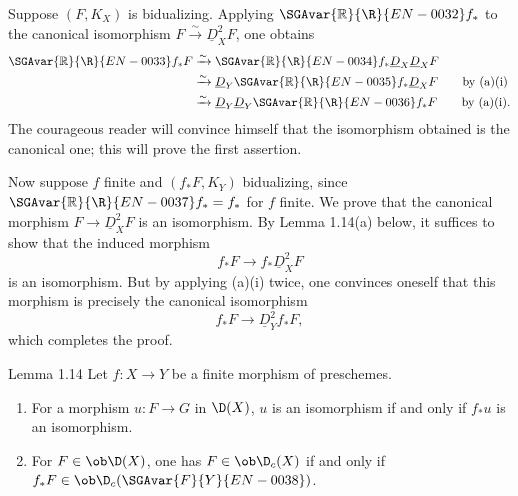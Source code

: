 \begin{prooftext}
Suppose $(F,K_X)$ is bidualizing. Applying $\SGAvar{\mathbb{R}}{\R}{EN-0032} f_*$ to the canonical isomorphism $F\xrightarrow{\sim}\underline D_X^2F$, one obtains
\begin{align*}
\SGAvar{\mathbb{R}}{\R}{EN-0033} f_*F &\xrightarrow{\sim}\SGAvar{\mathbb{R}}{\R}{EN-0034} f_*\underline D_X\underline D_XF \\
&\xrightarrow{\sim}\underline D_Y\SGAvar{\mathbb{R}}{\R}{EN-0035} f_*\underline D_XF \qquad \text{by (a)(i)}\\
&\xrightarrow{\sim}\underline D_Y\underline D_Y\SGAvar{\mathbb{R}}{\R}{EN-0036} f_*F \qquad \text{by (a)(i)}.
\end{align*}
The courageous reader will convince himself that the isomorphism obtained is the canonical one; this will prove the first assertion.

Now suppose $f$ finite and $(f_*F,K_Y)$ bidualizing, since $\SGAvar{\mathbb{R}}{\R}{EN-0037} f_*=f_*$ for $f$ finite. We prove that the canonical morphism $F\to\underline D_X^2F$ is an isomorphism. By Lemma 1.14(a) below, it suffices to show that the induced morphism
\[
   f_*F\longrightarrow f_*\underline D_X^2F
\]
is an isomorphism. But by applying (a)(i) twice, one convinces oneself that this morphism is precisely the canonical isomorphism
\[
   f_*F\longrightarrow \underline D_Y^2f_*F,
\]
which completes the proof. \qedtext
\end{prooftext}

\begin{statement}{Lemma 1.14}
Let $f:X\to Y$ be a finite morphism of preschemes.
\begin{enumerate}[label=\alph*)]
\item For a morphism $u:F\to G$ in $\D(X)$, $u$ is an isomorphism if and only if $f_*u$ is an isomorphism.
\item For $F\in\ob\D(X)$, one has $F\in\ob\D_c(X)$ if and only if $f_*F\in\ob\D_c(\SGAvar{F}{Y}{EN-0038})$.
\end{enumerate}
\end{statement}

